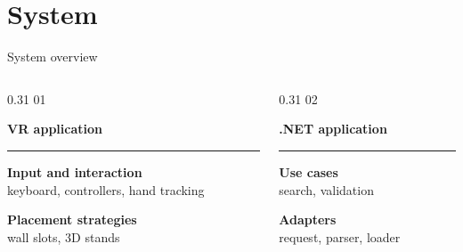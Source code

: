 \section{System}
\begin{frame}[c]{System overview}
\begin{columns}[T,onlytextwidth]
  \begin{column}{0.31\textwidth}
    \textcolor{unired}{\LARGE 01}

    \vspace{0.1cm}
    \large\textbf{VR application}

    \vspace{0.12cm}
    \color{unimint}\rule{\linewidth}{1.6pt}
    \color{black}

    \raggedright

    \vspace{0.28cm}
    \raggedright\small
    \textbf{Input and interaction}\\
    keyboard, controllers, hand tracking

    \vspace{0.34cm}
    \textbf{Placement strategies}\\
    wall slots, 3D stands
  \end{column}

  \begin{column}{0.31\textwidth}
    \textcolor{unired}{\LARGE 02}

    \vspace{0.1cm}
    \large\textbf{.NET application}

    \vspace{0.12cm}
    \color{unimint}\rule{\linewidth}{1.6pt}
    \color{black}

    \raggedright

    \vspace{0.28cm}
    \raggedright\small
    \textbf{Use cases}\\
    search, validation

    \vspace{0.34cm}
    \textbf{Adapters}\\
    request, parser, loader
  \end{column}


\end{columns}
\end{frame}

